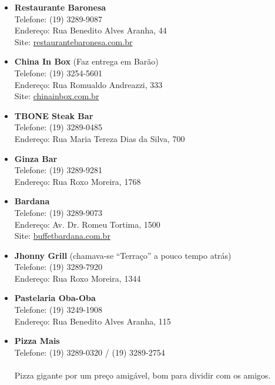 \begin{itemize}
    \item   \textbf{Restaurante Baronesa}
        \\Telefone: (19) 3289-9087
        \\Endereço: Rua Benedito Alves Aranha, 44
        \\Site: \url{restaurantebaronesa.com.br}

    \item   \textbf{China In Box} (Faz entrega em Barão)
        \\Telefone: (19) 3254-5601
        \\Endereço: Rua Romualdo Andreazzi, 333
        \\Site: \url{chinainbox.com.br}

    \item   \textbf{TBONE Steak Bar}
        \\Telefone: (19) 3289-0485
        \\Endereço: Rua Maria Tereza Dias da Silva, 700

    \item   \textbf{Ginza Bar}
        \\Telefone: (19) 3289-9281
        \\Endereço: Rua Roxo Moreira, 1768

    \item   \textbf{Bardana}
        \\Telefone: (19) 3289-9073
        \\Endereço: Av. Dr. Romeu Tortima, 1500
        \\Site: \url{buffetbardana.com.br}

    \item   \textbf{Jhonny Grill} (chamava-se ``Terraço'' a pouco tempo atrás)
        \\Telefone: (19) 3289-7920
        \\Endereço: Rua Roxo Moreira, 1344

    \item   \textbf{Pastelaria Oba-Oba}
        \\Telefone: (19) 3249-1908
        \\Endereço: Rua Benedito Alves Aranha, 115

    \item   \textbf{Pizza Mais}
        \\Telefone: (19) 3289-0320 / (19) 3289-2754
        \\\\Pizza gigante por um preço amigável, bom para dividir com os amigos.


\end{itemize}
